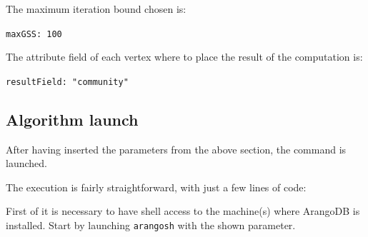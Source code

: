 The maximum iteration bound chosen is:

\noindent\colorbox{lightestgray}{
	\parbox{1\linewidth-9pt}{%
		\texttt{maxGSS: 100}
	}%
}%

The attribute field of each vertex where to place the result of the computation is:

\noindent\colorbox{lightestgray}{
	\parbox{1\linewidth-9pt}{%
		\texttt{resultField: "community"}%
	}%
}%

\subsection{Algorithm launch} \label{subsection:CommunityDetection/ClusteringcollaborationcommunitiesAlgorithmexecution/Algorithmlaunch}
After having inserted the parameters from the above section, the command is launched.

The execution is fairly straightforward, with just a few lines of code:

First of it is necessary to have shell access to the machine(s) where ArangoDB is installed.
Start by launching \texttt{arangosh} with the shown parameter.


